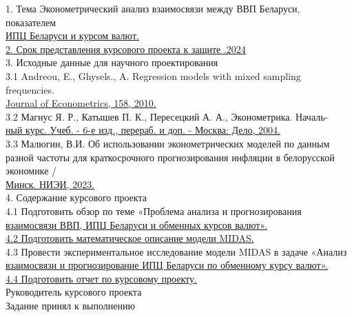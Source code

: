 \documentclass[a4paper, 12pt]{extarticle}
\numberwithin{equation}{subsection}
\begin{document}
	1. Тема \hspace{5mm} Эконометрический анализ взаимосвязи между ВВП Беларуси, показателем \\
	\hspace*{22mm}\underline{ИПЦ Беларуси и курсом валют.\hspace*{\linegoal}}\\[2mm]
	\underline{2. Срок представления курсового проекта к защите  \quad {}.2024 \hspace*{\linegoal}}\\[2mm]
	3. Исходные данные для научного проектирования\\[2mm]
	3.1 Andreou, E., Ghysels., A. Regression models with mixed sampling frequencies.\\
	\underline{Journal of Econometrics, 158, 2010.\hspace*{\linegoal}}\\[2mm]
	3.2 Магнус Я. Р., Катышев П. К., Пересецкий А. А., Эконометрика. Началь-\\
	\underline{ный курс. Учеб. - 6-е изд., перераб. и доп. - Москва: Дело, 2004.\hspace*{\linegoal}} \\[2mm]
	3.3 Малюгин, В.И. Об использовании эконометрических моделей по данным разной частоты для краткосрочного прогнозирования инфляции в белорусской экономике / \\
	\underline{Минск. НИЭИ, 2023.\hspace*{\linegoal}}\\[2mm]
	4. Содержание курсового проекта\\[2mm]
	4.1 Подготовить обзор по теме «Проблема анализа и прогнозирования \\
	\underline{взаимосвязи ВВП, ИПЦ Беларуси и обменных курсов валют».\hspace*{\linegoal}}\\[2mm]
	\underline{4.2 Подготовить математическое описание модели MIDAS.\hspace*{\linegoal}}\\[2mm]
	4.3 Провести экспериментальное исследование модели MIDAS в задаче «Анализ \\
	\underline{взаимосвязи и прогнозирование ИПЦ Беларуси по обменному курсу валют».\hspace*{\linegoal}}\\[2mm]
	\underline{4.4 Подготовить отчет по курсовому проекту.\hspace*{\linegoal}}\\[2mm]
	\vfill
	\noindent Руководитель курсового проекта \\[2mm]
	Задание принял к выполнению \hspace*{4mm} \\[2mm]
	\newpage
	\tableofcontents
	\newpage
\end{document}
